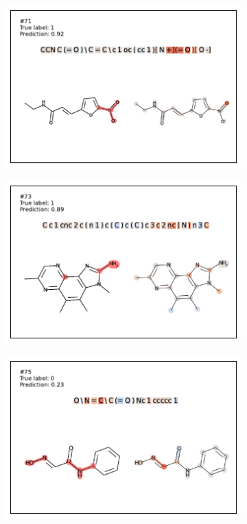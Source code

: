 \begin{figure}
\begin{subfigure}[b]{0.33\textwidth}
\end{subfigure} 
\begin{subfigure}[b]{0.33\textwidth} 
  \centering 
  \includegraphics[width=\textwidth]{figures/ames/ames71.pdf} 
\end{subfigure}\begin{subfigure}[b]{0.33\textwidth} 
  \centering 
  \includegraphics[width=\textwidth]{figures/ames/ames73.pdf} 
\end{subfigure}\begin{subfigure}[b]{0.33\textwidth} 
  \centering 
  \includegraphics[width=\textwidth]{figures/ames/ames75.pdf} 

\end{subfigure}
\end{figure}
